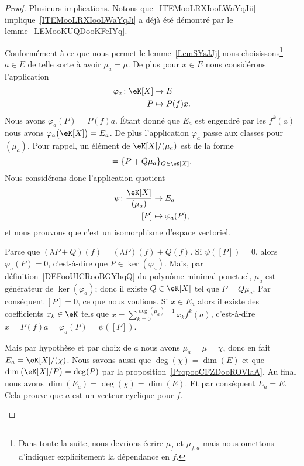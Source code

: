 \begin{proof}
	Plusieurs implications. Notons que~\ref{ITEMooLRXIooLWaYqJii} implique~\ref{ITEMooLRXIooLWaYqJi} a déjà été démontré par le lemme~\ref{LEMooKUQDooKFeIYq}.
	\begin{subproof}
		Conformément à ce que nous permet le lemme~\ref{LemSYsJJj} nous choisissons\footnote{Dans toute la suite, nous devrions écrire \( \mu_f\) et \( \mu_{f,a}\) mais nous omettons d'indiquer explicitement la dépendance en \( f\).} \( a\in E\) de telle sorte à avoir \( \mu_a=\mu\). De plus pour \( x\in E\) nous considérons l'application
		\begin{equation}
			\begin{aligned}
				\varphi_x\colon \eK[X] & \to E          \\
				P                      & \mapsto P(f)x.
			\end{aligned}
		\end{equation}
		Nous avons \( \varphi_a(P)=P(f)a\). Étant donné que \( E_{a}\) est engendré par les \( f^k(a)\) nous avons \( \varphi_a\big( \eK[X] \big)=E_a\). De plus l'application \( \varphi_a\) passe aux classes pour \( (\mu_a)\). Pour rappel, un élément de \( \eK[X]/(\mu_a)\) est de la forme
		\begin{equation}
			[P]=\{ P+Q\mu_a \}_{Q\in \eK[X]}.
		\end{equation}
		Nous considérons donc l'application quotient
		\begin{equation}
			\begin{aligned}
				\psi\colon \frac{ \eK[X] }{ (\mu_a) } & \to E_a               \\
				[P]                                   & \mapsto \varphi_a(P),
			\end{aligned}
		\end{equation}
		et nous prouvons que c'est un isomorphisme d'espace vectoriel.
		\begin{subproof}
			\spitem[Linéaire]
			Parce que \( (\lambda P+Q)(f)=(\lambda P)(f)+Q(f)\).
			\spitem[Injectif]
			Si \( \psi([P])=0\), alors \( \varphi_a(P)=0\), c'est-à-dire que \( P\in \ker(\varphi_a)\).  Mais, par définition~\ref{DEFooUICRooBGYhqQ} du polynôme minimal ponctuel, \( \mu_a\) est générateur de \( \ker(\varphi_a)\); donc il existe \( Q\in \eK[X]\) tel que \( P=Q\mu_a\). Par conséquent \( [P]=0\), ce que nous voulions.
			\spitem[Surjectif]
			Si \( x\in E_a\) alors il existe des coefficients \( x_k\in \eK\) tels que \( x=\sum_{k=0}^{\deg(\mu_a)-1}x_kf^k(a)\), c'est-à-dire \( x=P(f)a=\varphi_a(P)=\psi([P])\).
		\end{subproof}
		Mais par hypothèse et par choix de \( a\) nous avons \( \mu_a=\mu=\chi\), donc en fait \( E_a=\eK[X]/(\chi)\). Nous savons aussi que \( \deg(\chi)=\dim(E)\) et que \( \dim\big( \eK[X]/P \big)=\deg(P)\) par la proposition~\ref{PropooCFZDooROVlaA}. Au final nous avons \( \dim(E_a)=\deg(\chi)=\dim(E)\). Et par conséquent \( E_a=E\). Cela prouve que \( a\) est un vecteur cyclique pour \( f\).


\end{subproof}
\end{proof}
